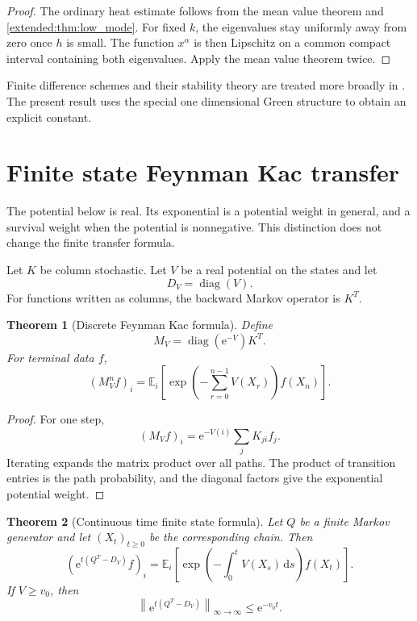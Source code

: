 \documentclass[11pt,letterpaper]{article}
\newtheorem{theorem}{Theorem}[section]
\theoremstyle{plain}
\theoremstyle{plain}
\theoremstyle{plain}
\theoremstyle{definition}
\theoremstyle{definition}
\theoremstyle{definition}
\theoremstyle{definition}
\theoremstyle{definition}
\theoremstyle{remark}
\theoremstyle{remark}
\theoremstyle{remark}
\theoremstyle{remark}
\theoremstyle{remark}
\newcommand{\Exp}{\mathbb E}
\newcommand{\diag}{\operatorname{diag}}
\newcommand{\norm}[1]{\left\lVert#1\right\rVert}
\theoremstyle{remark}
\newcommand{\e}{\mathrm e}
\newcommand{\dd}{\,\mathrm d}
\let\KomorebiPrimitivemathbb\mathbb
\renewcommand{\mathbb}[1]{{\KomorebiPrimitivemathbb{#1}}}
\let\KomorebiPrimitivemathrm\mathrm
\renewcommand{\mathrm}[1]{{\KomorebiPrimitivemathrm{#1}}}
\begin{document}
\begin{proof}
The ordinary heat estimate follows from the mean value theorem and \cref{extended:thm:low_mode}. For fixed \(k\), the eigenvalues stay uniformly away from zero once \(h\) is small. The function \(x^\alpha\) is then Lipschitz on a common compact interval containing both eigenvalues. Apply the mean value theorem twice.
\end{proof}

Finite difference schemes and their stability theory are treated more broadly in \cite{Strikwerda2004}. The present result uses the special one dimensional Green structure to obtain an explicit constant.

\FloatBarrier
\section{Finite state Feynman Kac transfer}\label{extended:section:13}\label{extended:sec:feynman_kac}
\begin{interpretation}
The potential below is real. Its exponential is a potential weight in general, and a survival weight when the potential is nonnegative. This distinction does not change the finite transfer formula.
\end{interpretation}

Let \(K\) be column stochastic. Let \(V\) be a real potential on the states and let
\[
D_V=\diag(V).
\]
For functions written as columns, the backward Markov operator is \(K^T\).

\begin{theorem}[Discrete Feynman Kac formula]\label{extended:record:081}\label{extended:thm:discrete_feynman_kac}
Define
\[
M_V=\diag(\e^{-V})K^T.
\]
For terminal data \(f\),
\[
(M_V^nf)_i
=
\Exp_i\left[
\exp\left(
-\sum_{r=0}^{n-1}V(X_r)
\right)
f(X_n)
\right].
\]
\end{theorem}

\begin{proof}
For one step,
\[
(M_Vf)_i
=
\e^{-V(i)}\sum_jK_{ji}f_j.
\]
Iterating expands the matrix product over all paths. The product of transition entries is the path probability, and the diagonal factors give the exponential potential weight.
\end{proof}

\begin{theorem}[Continuous time finite state formula]\label{extended:record:082}\label{extended:thm:continuous_feynman_kac}
Let \(Q\) be a finite Markov generator and let \((X_t)_{t\geq0}\) be the corresponding chain. Then
\[
\left(
\e^{t(Q^T-D_V)}f
\right)_i
=
\Exp_i\left[
\exp\left(
-\int_0^tV(X_s)\dd s
\right)
f(X_t)
\right].
\]
If \(V\geq v_0\), then
\[
\norm{\e^{t(Q^T-D_V)}}_{\infty\to\infty}
\leq
\e^{-v_0t}.
\]
\end{theorem}
\end{document}
